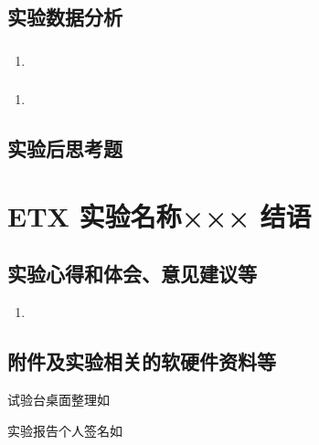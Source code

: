 \documentclass[dvipsnames, svgnames,a4paper,11pt]{article}
\begin{document}
	\subsection{实验数据分析}
	
	\subsubsection{}
	\begin{enumerate}
		\item 
	\end{enumerate}
	
	\subsubsection{}
	\begin{enumerate}
		\item 
	\end{enumerate}
	
	\subsubsection{}
	
	
	\subsection{实验后思考题}
	
	\begin{question}
		
	\end{question}
	
	\begin{question}
		
	\end{question}
	
	\begin{question}
		
	\end{question}
	
	
	
	\clearpage
	
	\section{ETX 实验名称××× \quad\heiti 结语}
	
	\subsection{实验心得和体会、意见建议等}
	\begin{enumerate}
		\item 
	\end{enumerate}
	

	\subsection{附件及实验相关的软硬件资料等}
	试验台桌面整理如%
	
	实验报告个人签名如

	
	
\end{document}
